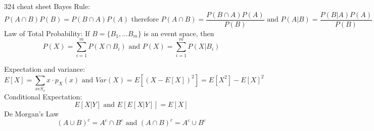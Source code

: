 \documentclass{report}
\begin{document}
324 cheat sheet
Bayes Rule:
$$ P(A\cap B)P(B) = P(B\cap A)P(A)  \text{ therefore }  P(A\cap B) = \frac{P(B\cap A)P(A)}{P(B)} \text{ and } P(A|B) = \frac{P(B|A)P(A)}{P(B)}$$
Law of Total Probability: If $B = \{B_1, ... B_m\}$ is an event space, then
$$ P(X) = \sum_{i=1}^{m} P(X\cap B_i) \text{ and } P(X) = \sum_{i=1}^{m} P(X|B_i) $$

Expectation and variance:
$$ E[X] = \sum_{x \epsilon S_x} x \cdot p_X(x) \text{ and } Var(X) = E[(X-E[X])^2] = E[X^2]-E[X]^2 $$
Conditional Expectation:
$$ E[X|Y] \text{ and } E[E[X|Y]] = E[X] $$
De Morgan's Law
$$ (A\cup B)^c = A^c \cap B^c \text{ and } (A\cap B)^c = A^c \cup B^c $$


 
\end{document}
